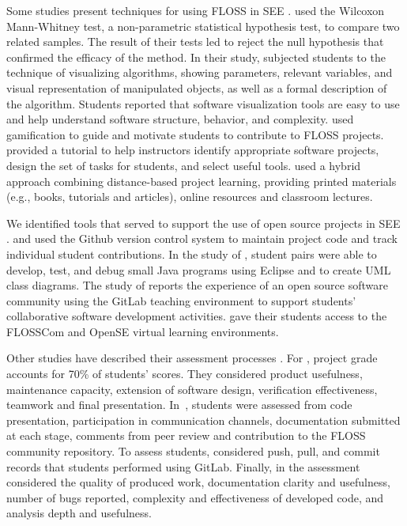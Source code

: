 Some studies present techniques for using FLOSS in SEE \cite{id0106, id0134, id1192, id17800, id5676}. \citeauthor{id0106} used the Wilcoxon Mann-Whitney test, a non-parametric statistical hypothesis test, to compare two related samples. The result of their tests led to reject the null hypothesis that confirmed the efficacy of the method. 
In their study, \citeauthor{id0134} subjected students 
to the technique of visualizing algorithms, showing parameters, relevant variables, 
and visual representation of manipulated objects, as well as a formal description of the algorithm. Students reported that software visualization tools are easy to use and help understand software structure, behavior, and complexity. 
\citeauthor{id1192} used gamification to guide and motivate students to contribute to FLOSS projects. \citeauthor{id17800} provided a tutorial to help instructors identify appropriate software projects, design the set of tasks for students, and select useful tools. \citeauthor{id5676} used a hybrid approach combining distance-based project learning, providing printed materials (e.g., books, tutorials and articles), online resources and classroom lectures.

We identified tools that served to support the use of open source projects in SEE \cite{id1088, id17882, id5357, id0089, id5676}. \citeauthor{id1088} and \citeauthor{id17882} used the Github version control system to maintain project code and track individual student contributions. In the study of \citeauthor{id5357}, student pairs were able to develop, test, and debug small Java programs using Eclipse and to create UML class diagrams. The study of \citeauthor{id0089} reports the experience of an open source software community using the GitLab teaching environment to support students' collaborative software development activities. \citeauthor{id5676} gave their students access to the FLOSSCom and OpenSE virtual learning environments.

Other studies have described their assessment processes \cite{id4663, id0093, id0089, id5676}. 
For \citeauthor{id4663}, project grade accounts for 70\% of students' scores. They considered product usefulness, maintenance capacity, extension of software design, verification effectiveness, teamwork and final presentation. In~\cite{id0093}, students were assessed from code presentation, participation in communication channels, documentation submitted at each stage, comments from peer review and contribution to the FLOSS community repository. To assess students, \citeauthor{id0089} considered push, pull, and commit records that students performed using GitLab. Finally, in \cite{id5676} the assessment considered the quality of produced work, documentation clarity and usefulness, number of bugs reported, complexity and effectiveness of developed code, and analysis depth and usefulness.

